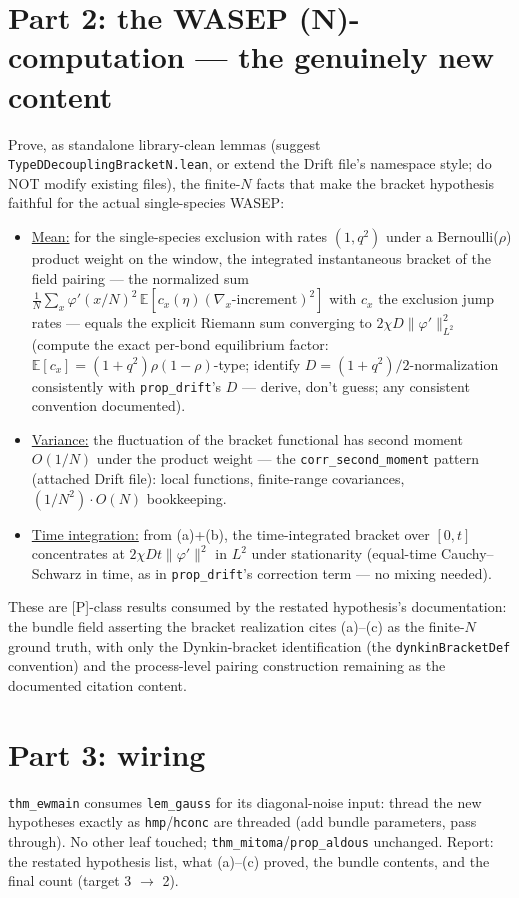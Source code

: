 \documentclass[11pt]{article}
\theoremstyle{plain}
\theoremstyle{remark}
\newcommand{\E}{\mathbb{E}}\newcommand{\R}{\mathbb{R}}
\begin{document}
\section*{Part 2: the WASEP (N)-computation --- the genuinely new content}

Prove, as standalone library-clean lemmas (suggest
\texttt{TypeDDecouplingBracketN.lean}, or extend the Drift file's namespace
style; do NOT modify existing files), the finite-$N$ facts that make the
bracket hypothesis faithful for the actual single-species WASEP:
\begin{itemize}
\item[(a)] \underline{Mean:} for the single-species exclusion with rates
$(1,q^2)$ under a Bernoulli($\rho$) product weight on the window, the
integrated instantaneous bracket of the field pairing --- the normalized sum
$\frac1N\sum_x\varphi'(x/N)^2\,\E[c_x(\eta)(\nabla_x\text{-increment})^2]$
with $c_x$ the exclusion jump rates --- equals the explicit Riemann sum
converging to $2\chi D\|\varphi'\|_{L^2}^2$ (compute the exact per-bond
equilibrium factor: $\E[c_x] = (1+q^2)\rho(1-\rho)$-type; identify
$D=(1+q^2)/2$-normalization consistently with \texttt{prop\_drift}'s $D$ ---
derive, don't guess; any consistent convention documented).
\item[(b)] \underline{Variance:} the fluctuation of the bracket functional has
second moment $O(1/N)$ under the product weight --- the
\texttt{corr\_second\_moment} pattern (attached Drift file): local functions,
finite-range covariances, $(1/N^2)\cdot O(N)$ bookkeeping.
\item[(c)] \underline{Time integration:} from (a)+(b), the time-integrated
bracket over $[0,t]$ concentrates at $2\chi Dt\|\varphi'\|^2$ in $L^2$ under
stationarity (equal-time Cauchy--Schwarz in time, as in \texttt{prop\_drift}'s
correction term --- no mixing needed).
\end{itemize}
These are [P]-class results consumed by the restated hypothesis's
documentation: the bundle field asserting the bracket realization cites (a)--(c)
as the finite-$N$ ground truth, with only the Dynkin-bracket identification
(the \texttt{dynkinBracketDef} convention) and the process-level pairing
construction remaining as the documented citation content.

\section*{Part 3: wiring}

\texttt{thm\_ewmain} consumes \texttt{lem\_gauss} for its diagonal-noise
input: thread the new hypotheses exactly as \texttt{hmp}/\texttt{hconc} are
threaded (add bundle parameters, pass through). No other leaf touched;
\texttt{thm\_mitoma}/\texttt{prop\_aldous} unchanged. Report: the restated
hypothesis list, what (a)--(c) proved, the bundle contents, and the final
count (target 3 $\to$ 2).
\end{document}
